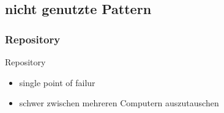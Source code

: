 \documentclass{beamer}
\begin{document}
		
		\subsection{nicht genutzte Pattern}
		
%					
%				
%				
%		
%				
		
		\subsubsection{Repository}
		\begin{frame}{Repository}
			\begin{itemize}
				\item single point of failur
				\item schwer zwischen mehreren Computern auszutauschen%
				
			\end{itemize}
		\end{frame}
		
\end{document}
